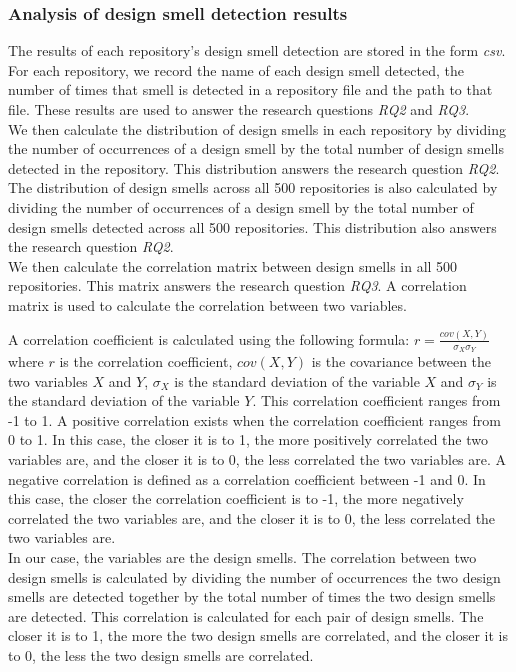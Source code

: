 \subsubsection{Analysis of design smell detection results}
\label{sec:AnalysisOfDesignSmellDetectionResults}
The results of each repository's design smell detection are stored in the form \emph{csv}. For each repository, we record the name of each design smell detected, the number of times that smell is detected in a repository file and the path to that file. These results are used to answer the research questions \emph{RQ2} and \emph{RQ3}.\\
We then calculate the distribution of design smells in each repository by dividing the number of occurrences of a design smell by the total number of design smells detected in the repository. This distribution answers the research question \emph{RQ2}. The distribution of design smells across all 500 repositories is also calculated by dividing the number of occurrences of a design smell by the total number of design smells detected across all 500 repositories. This distribution also answers the research question \emph{RQ2}.\\

We then calculate the correlation matrix between design smells in all 500
repositories. This matrix answers the research question \emph{RQ3}. A
correlation matrix is used to calculate the correlation between two variables.


A correlation coefficient is calculated using the following formula:  $r =
  \frac{cov(X,Y)}{\sigma_X \sigma_Y}$  where $r$ is the correlation coefficient, $cov(X,Y)$ is the covariance between the two variables $X$ and $Y$, $\sigma_X$ is the standard deviation of the variable $X$ and $\sigma_Y$ is the standard deviation of the variable $Y$. This correlation coefficient ranges from -1 to 1. A positive correlation exists when the correlation coefficient ranges from 0 to 1. In this case, the closer it is to 1, the more positively correlated the two variables are, and the closer it is to 0, the less correlated the two variables are. A negative correlation is defined as a correlation coefficient between -1 and 0. In this case, the closer the correlation coefficient is to -1, the more negatively correlated the two variables are, and the closer it is to 0, the less correlated the two variables are.\\



In our case, the variables are the design smells. The correlation between two design smells is calculated by dividing the number of occurrences the two design smells are detected together by the total number of times the two design smells are detected. This correlation is calculated for each pair of design smells. The closer it is to 1, the more the two design smells are correlated, and the closer it is to 0, the less the two design smells are correlated.\\

